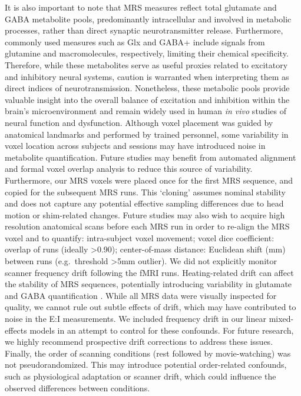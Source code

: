 \documentclass[
true
]{sn-jnl}
\begin{document}
It is also important to note that MRS measures reflect total glutamate
and GABA metabolite pools, predominantly intracellular and involved in
metabolic processes, rather than direct synaptic neurotransmitter
release. Furthermore, commonly used measures such as Glx and GABA+
include signals from glutamine and macromolecules, respectively,
limiting their chemical specificity. Therefore, while these metabolites
serve as useful proxies related to excitatory and inhibitory neural
systems, caution is warranted when interpreting them as direct indices
of neurotransmission. Nonetheless, these metabolic pools provide
valuable insight into the overall balance of excitation and inhibition
within the brain's microenvironment and remain widely used in human
\emph{in vivo} studies of neural function and dysfunction. Although
voxel placement was guided by anatomical landmarks and performed by
trained personnel, some variability in voxel location across subjects
and sessions may have introduced noise in metabolite quantification.
Future studies may benefit from automated alignment and formal voxel
overlap analysis to reduce this source of variability. Furthermore, our
MRS voxels were placed once for the first MRS sequence, and copied for
the subsequent MRS runs. This `cloning' assumes nominal stability and
does not capture any potential effective sampling differences due to
head motion or shim-related changes. Future studies may also wish to
acquire high resolution anatomical scans before each MRS run in order to
re-align the MRS voxel and to quantify: intra-subject voxel movement;
voxel dice coefficient: overlap of runs (ideally \textgreater0.90);
center-of-mass distance: Euclidean shift (mm) between runs
(e.g.~threshold \textgreater5mm outlier). We did not explicitly monitor
scanner frequency drift following the fMRI runs. Heating-related drift
can affect the stability of MRS sequences, potentially introducing
variability in glutamate and GABA quantification
\citep{huiFrequencyDriftMR2021}. While all MRS data were visually
inspected for quality, we cannot rule out subtle effects of drift, which
may have contributed to noise in the E:I measurements. We included
frequency drift in our linear mixed-effects models in an attempt to
control for these confounds. For future research, we highly recommend
prospective drift corrections to address these issues. Finally, the
order of scanning conditions (rest followed by movie-watching) was not
pseudorandomized. This may introduce potential order-related confounds,
such as physiological adaptation or scanner drift, which could influence
the observed differences between conditions.
\end{document}
